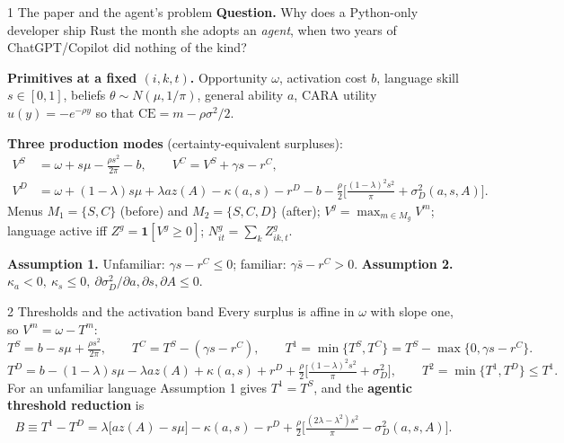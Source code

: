 \documentclass[aspectratio=169,11pt]{beamer}
\newcommand{\ind}{\mathbf 1}
\begin{document}
\begin{frame}{1 \textperiodcentered{} The paper and the agent's problem}
  \textbf{Question.} Why does a Python-only developer ship Rust the month she adopts an
  \emph{agent}, when two years of ChatGPT/Copilot did nothing of the kind?

  \medskip
  \textbf{Primitives at a fixed $(i,k,t)$.} Opportunity $\omega$, activation cost $b$,
  language skill $s\in[0,1]$, beliefs $\theta\sim N(\mu,1/\pi)$, general ability $a$,
  CARA utility $u(y)=-e^{-\rho y}$ so that $\mathrm{CE}=m-\rho\sigma^2/2$.

  \medskip
  \textbf{Three production modes} (certainty-equivalent surpluses):
  \begin{align*}
    V^S &= \omega + s\mu - \tfrac{\rho s^2}{2\pi} - b, \qquad
    V^C = V^S + \gamma s - r^C,\\
    V^D &= \omega + (1-\lambda)s\mu + \lambda a z(A) - \kappa(a,s) - r^D - b
          - \tfrac{\rho}{2}\Big[\tfrac{(1-\lambda)^2 s^2}{\pi} + \sigma_D^2(a,s,A)\Big].
  \end{align*}
  Menus $M_1=\{S,C\}$ (before) and $M_2=\{S,C,D\}$ (after); $V^g=\max_{m\in M_g}V^m$;
  language active iff $Z^g=\ind[V^g\ge 0]$; $N^g_{it}=\sum_k Z^g_{ik,t}$.

  \medskip
  \textbf{Assumption 1.} Unfamiliar: $\gamma s - r^C\le 0$; familiar: $\gamma\bar s - r^C>0$.\quad
  \textbf{Assumption 2.} $\kappa_a<0,\ \kappa_s\le 0,\ \partial\sigma_D^2/\partial a,\partial s,\partial A\le 0$.
\end{frame}

\begin{frame}{2 \textperiodcentered{} Thresholds and the activation band}
  Every surplus is affine in $\omega$ with slope one, so $V^m=\omega-T^m$:
  {\small
  \[
    T^S = b - s\mu + \tfrac{\rho s^2}{2\pi},\qquad
    T^C = T^S - (\gamma s - r^C),\qquad
    T^1=\min\{T^S,T^C\} = T^S-\max\{0,\gamma s - r^C\}.
  \]}
  {\small
  \[
    T^D = b-(1-\lambda)s\mu-\lambda a z(A)+\kappa(a,s)+r^D
          +\tfrac{\rho}{2}\Big[\tfrac{(1-\lambda)^2s^2}{\pi}+\sigma_D^2\Big],\qquad
    T^2=\min\{T^1,T^D\}\le T^1.
  \]}
  For an unfamiliar language Assumption 1 gives $T^1=T^S$, and the \textbf{agentic
  threshold reduction} is
  \[
    B \equiv T^1-T^D
      = \lambda\big[a z(A)-s\mu\big]-\kappa(a,s)-r^D
        +\tfrac{\rho}{2}\Big[\tfrac{(2\lambda-\lambda^2)s^2}{\pi}-\sigma_D^2(a,s,A)\Big].
  \]
  \begin{center}
  \end{center}
\end{frame}
\end{document}
